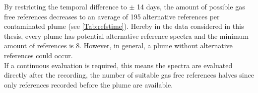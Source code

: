 
    \begin{table}[h]
    \centering
        \caption[Amount of possible references when restricting the time span between plume and reference to two weeks.]{Amount of possible references when restricting the time span between plume and reference to two weeks. Here in the ”Mean” and “Std” row for each instrument, the average restriction is shown with the corresponding standard deviation. The “Min” and “Max” rows show the extent of restriction in the extreme cases.}
    \label{Tab:refstime}
\end{table}    
By restricting the temporal difference to $\pm$ 14 days, the amount of possible gas free references decreases to an average of 195 alternative references per contaminated plume (see \cref{Tab:refstime}). Hereby in the data considered in this thesis, every plume has potential alternative reference spectra and the minimum amount of references is 8. However, in general, a plume without alternative references could occur.\\
If a continuous evaluation is required, this means the spectra are evaluated directly after the recording, the number of suitable gas free references halves since only references recorded before the plume are available.\\

